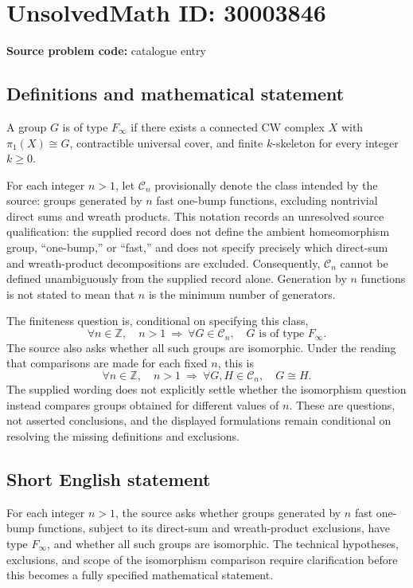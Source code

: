 \documentclass[11pt]{article}
\newcommand{\Z}{\mathbb{Z}}
\begin{document}
\section*{UnsolvedMath ID: 30003846}
\textbf{Source problem code:} catalogue entry
\subsection{Definitions and mathematical statement}
A group \(G\) is of type \(F_\infty\) if there exists a connected CW complex \(X\) with \(\pi_1(X)\cong G\), contractible universal cover, and finite \(k\)-skeleton for every integer \(k\geq 0\).

For each integer \(n>1\), let \(\mathcal C_n\) provisionally denote the class intended by the source: groups generated by \(n\) fast one-bump functions, excluding nontrivial direct sums and wreath products. This notation records an unresolved source qualification: the supplied record does not define the ambient homeomorphism group, ``one-bump,'' or ``fast,'' and does not specify precisely which direct-sum and wreath-product decompositions are excluded. Consequently, \(\mathcal C_n\) cannot be defined unambiguously from the supplied record alone. Generation by \(n\) functions is not stated to mean that \(n\) is the minimum number of generators.

The finiteness question is, conditional on specifying this class,
\[
\forall n\in\Z,\quad n>1\ \Longrightarrow\ \forall G\in\mathcal C_n,\quad G\text{ is of type }F_\infty.
\]
The source also asks whether all such groups are isomorphic. Under the reading that comparisons are made for each fixed \(n\), this is
\[
\forall n\in\Z,\quad n>1\ \Longrightarrow\ \forall G,H\in\mathcal C_n,\quad G\cong H.
\]
The supplied wording does not explicitly settle whether the isomorphism question instead compares groups obtained for different values of \(n\). These are questions, not asserted conclusions, and the displayed formulations remain conditional on resolving the missing definitions and exclusions.
\subsection{Short English statement}
For each integer \(n>1\), the source asks whether groups generated by \(n\) fast one-bump functions, subject to its direct-sum and wreath-product exclusions, have type \(F_\infty\), and whether all such groups are isomorphic. The technical hypotheses, exclusions, and scope of the isomorphism comparison require clarification before this becomes a fully specified mathematical statement.
\end{document}
